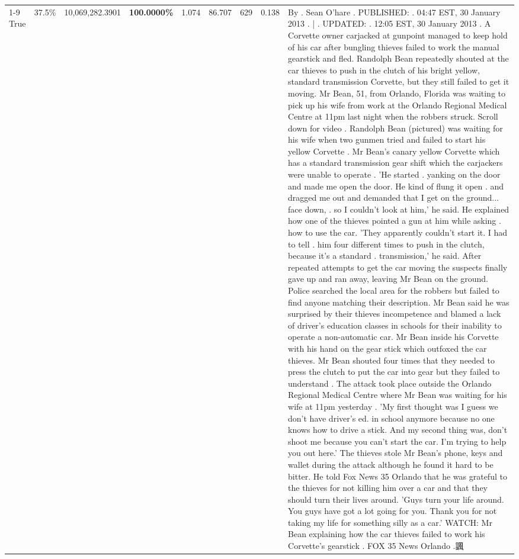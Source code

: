 \begin{table}[H]
\begin{tabular}{lllrlllll}
\cline{1-9} \cline{2-9}
True & 37.5\% & 10,069,282.3901 & \bfseries \color{red} 100.0000\% & 1.074 & 86.707 & 629 & 0.138 & By . Sean O'hare . PUBLISHED: . 04:47 EST, 30 January 2013 . | . UPDATED: . 12:05 EST, 30 January 2013 . A Corvette owner carjacked at gunpoint managed to keep hold of his car after bungling thieves failed to work the manual gearstick and fled. Randolph Bean repeatedly shouted at the car thieves to push in the clutch of his bright yellow, standard transmission Corvette, but they still failed to get it moving. Mr Bean, 51, from Orlando, Florida was waiting to pick up his wife from work at the Orlando Regional Medical Centre at 11pm last night when the robbers struck. Scroll down for video . Randolph Bean (pictured) was waiting for his wife when two gunmen tried and failed to start his yellow Corvette . Mr Bean's canary yellow Corvette which has a standard transmission gear shift which the carjackers were unable to operate . 'He started . yanking on the door and made me open the door. He kind of flung it open . and dragged me out and demanded that I get on the ground... face down, . so I couldn't look at him,' he said. He explained how one of the thieves pointed a gun at him while asking . how to use the car. 'They apparently couldn't start it. I had to tell . him four different times to push in the clutch, because it's a standard . transmission,' he said. After repeated attempts to get the car moving the suspects finally gave up and ran away, leaving Mr Bean on the ground. Police searched the local area for the robbers but failed to find anyone matching their description. Mr Bean said he was surprised by their thieves incompetence and blamed a lack of driver's education classes in schools for their inability to operate a non-automatic car. Mr Bean inside his Corvette with his hand on the gear stick which outfoxed the car thieves. Mr Bean shouted four times that they needed to press the clutch to put the car into gear but they failed to understand . The attack took place outside the Orlando Regional Medical Centre where Mr Bean was waiting for his wife at 11pm yesterday . 'My first thought was I guess we don't have driver's ed. in school anymore because no one knows how to drive a stick. And my second thing was, don't shoot me because you can't start the car. I'm trying to help you out here.' The thieves stole Mr Bean's phone, keys and wallet during the attack although he found it hard to be bitter. He told Fox News 35 Orlando that he was grateful to the thieves for not killing him over a car and that they should turn their lives around. 'Guys turn your life around. You guys have got a lot going for you. Thank you for not taking my life for something silly as a car.' WATCH: Mr Bean explaining how the car thieves failed to work his Corvette's gearstick . FOX 35 News Orlando .諷 \\

\end{tabular}
\end{table}
